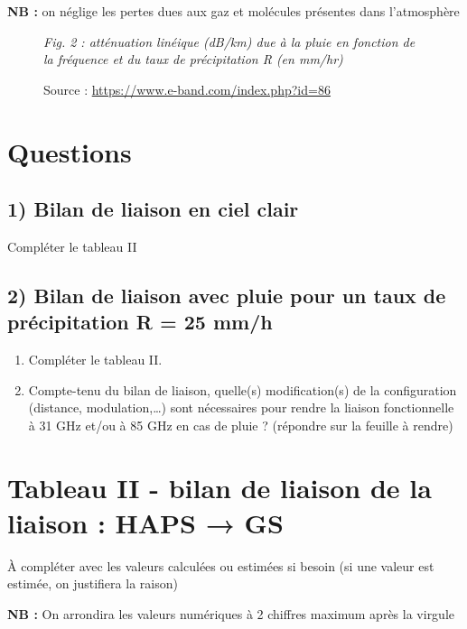 \documentclass[a4paper,11pt]{article}
\begin{document}
\textbf{NB :} on néglige les pertes dues aux gaz et molécules présentes dans l'atmosphère

\begin{figure}[h]
    \centering
    \textit{Fig. 2 : atténuation linéique (dB/km) due à la pluie en fonction de la fréquence et du taux de précipitation R (en mm/hr)}
    
    Source : \url{https://www.e-band.com/index.php?id=86}
\end{figure}

\section*{Questions}

\subsection*{1) Bilan de liaison en ciel clair}

Compléter le tableau II

\subsection*{2) Bilan de liaison avec pluie pour un taux de précipitation R = 25 mm/h}

\begin{enumerate}[label=\alph*)]
    \item Compléter le tableau II.
    
    \item Compte-tenu du bilan de liaison, quelle(s) modification(s) de la configuration (distance, modulation,\ldots) sont nécessaires pour rendre la liaison fonctionnelle à 31 GHz et/ou à 85 GHz en cas de pluie ? (répondre sur la feuille à rendre)
\end{enumerate}

\newpage

\section*{Tableau II - bilan de liaison de la liaison : HAPS → GS}

À compléter avec les valeurs calculées ou estimées si besoin (si une valeur est estimée, on justifiera la raison)

\textbf{NB :} On arrondira les valeurs numériques à 2 chiffres maximum après la virgule
\end{document}
